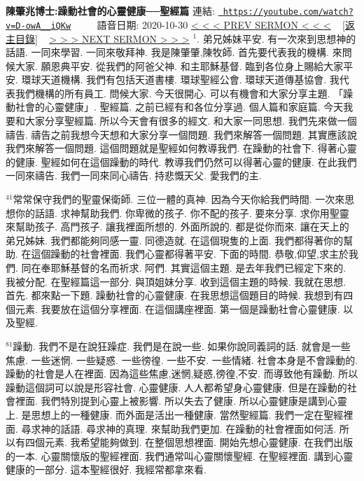\documentclass{book}
\begin{document}
\section{}
\label{sec:D_owA__iQKw}
\textbf{陳肇兆博士:躁動社會的心靈健康──聖經篇}
\newline
\newline
連結: \href{https://youtube.com/watch?v=D-owA__iQKw}{\texttt{ https://youtube.com/watch?v=D-owA\_\_iQKw}} ~~~~ 語音日期: 2020-10-30 
\newline
\newline
\hyperref[sec:ATvaAgvlFj8]{\small{< < < PREV SERMON < < <}}
~
\hyperref[sec:index]{\small{[返主目錄]}}
~
\hyperref[sec:mplCyadijHg]{\small{> > > NEXT SERMON > > >}}
\newline
\newline
$^{1}$.
弟兄姊妹平安.
有一次來到思想神的話語.
一同來學習.
一同來敬拜神.
我是陳肇肇,陳牧師.
首先要代表我的機構.
來問候大家.
願恩典平安.
從我們的阿爸父神.
和主耶穌基督.
臨到各位身上賜給大家平安.
環球天道機構.
我們有包括天道書樓.
環球聖經公會.
環球天道傳基協會.
我代表我們機構的所有員工.
問候大家.
今天很開心.
可以有機會和大家分享主題.
「躁動社會的心靈健康」.
聖經篇.
之前已經有和各位分享過.
個人篇和家庭篇.
今天我要和大家分享聖經篇.
所以今天會有很多的經文.
和大家一同思想.
我們先來做一個禱告.
禱告之前我想今天想和大家分享一個問題.
我們來解答一個問題.
其實應該說我們來解答一個問題.
這個問題就是聖經如何教導我們.
在躁動的社會下.
得著心靈的健康.
聖經如何在這個躁動的時代.
教導我們仍然可以得著心靈的健康.
在此我們一同來禱告.
我們一同來同心禱告.
持悲慨天父.
愛我們的主.

$^{41}$常常保守我們的聖靈保衛師.
三位一體的真神.
因為今天你給我們時間.
一次來思想你的話語.
求神幫助我們.
你卑微的孩子.
你不配的孩子.
要來分享.
求你用聖靈來幫助孩子.
高門孩子.
讓我裡面所想的.
外面所說的.
都是從你而來.
讓在天上的弟兄姊妹.
我們都能夠同感一靈.
同德造就.
在這個現隻的上面.
我們都得著你的幫助.
在這個躁動的社會裡面.
我們心靈都得著平安.
下面的時間.
恭敬,仰望,求主於我們.
同在奉耶穌基督的名而祈求.
阿們.
其實這個主題.
是去年我們已經定下來的.
我被分配.
在聖經篇這一部分.
與頂姐妹分享.
收到這個主題的時候.
我就在思想.
首先.
都來點一下題.
躁動社會的心靈健康.
在我思想這個題目的時候.
我想到有四個元素.
我要放在這個分享裡面.
在這個講座裡面.
第一個是躁動社會心靈健康.
以及聖經.

$^{81}$躁動.
我們不是在說狂躁症.
我們是在說一些.
如果你說同義詞的話.
就會是一些焦慮.
一些迷惘.
一些疑惑.
一些徬徨.
一些不安.
一些情緒.
社會本身是不會躁動的.
躁動的社會是人在裡面.
因為這些焦慮,迷惘,疑惑,徬徨,不安.
而導致他有躁動.
所以躁動這個詞可以說是形容社會.
心靈健康.
人人都希望身心靈健康.
但是在躁動的社會裡面.
我們特別提到心靈上被影響.
所以失去了健康.
所以心靈健康是講到心靈上.
是思想上的一種健康.
而外面是活出一種健康.
當然聖經篇.
我們一定在聖經裡面.
尋求神的話語.
尋求神的真理.
來幫助我們更加.
在躁動的社會裡面如何活.
所以有四個元素.
我希望能夠做到.
在整個思想裡面.
開始先想心靈健康.
在我們出版的一本.
心靈關懷版的聖經裡面.
我們通常叫心靈關懷聖經.
在聖經裡面.
講到心靈健康的一部分.
這本聖經很好.
我經常都拿來看.
\end{document}
